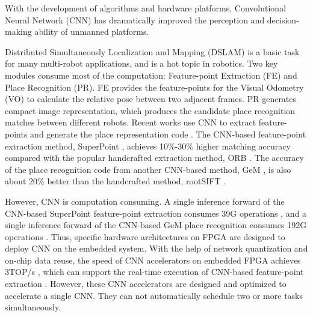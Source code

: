 With the development of algorithms and hardware platforms, Convolutional Neural Network (CNN) has dramatically improved the perception and decision-making ability of unmanned platforms. 

Distributed Simultaneously Localization and Mapping (DSLAM) is a basic task for many multi-robot applications, and is a hot topic in robotics. Two key modules consume most of the computation: Feature-point Extraction (FE) and Place Recognition (PR). 
FE provides the feature-points for the Visual Odometry (VO) to calculate the relative pose between two adjacent frames. PR generates compact image representation, which produces the candidate place recognition matches between different robots. 
Recent works use CNN to extract feature-points \cite{detone2018superpoint, simo2015discriminative, yi2016lift} and generate the place representation code \cite{arandjelovic2016netvlad, radenovic2018fine}. 
The CNN-based feature-point extraction method, SuperPoint \cite{detone2018superpoint}, achieves 10\%-30\% higher matching accuracy compared with the popular handcrafted extraction method, ORB \cite{Mur-Artal:2017281}.
The accuracy of the place recognition code from another CNN-based method, GeM \cite{radenovic2018fine}, is also about 20\% better than the handcrafted method, rootSIFT \cite{jegou2014triang}.

However, CNN is computation consuming. A single inference forward of the CNN-based SuperPoint feature-point extraction consumes 39G operations \cite{detone2018superpoint}, and a single inference forward of the CNN-based GeM place recognition consumes 192G operations \cite{radenovic2018fine}.
Thus, specific hardware architectures on FPGA \cite{guo2017angel,yu2018instruction,li_high_2016,qiu2016going,lu_evaluating_2017} are designed to deploy CNN on the embedded system.
With the help of network quantization and on-chip data reuse, the speed of CNN accelerators on embedded FPGA achieves 3TOP/s \cite{lu_evaluating_2017}, which can support the real-time execution of CNN-based feature-point extraction \cite{detone2018superpoint}.
However, these CNN accelerators are designed and optimized to accelerate a single CNN. They can not automatically schedule two or more tasks simultaneously. 


